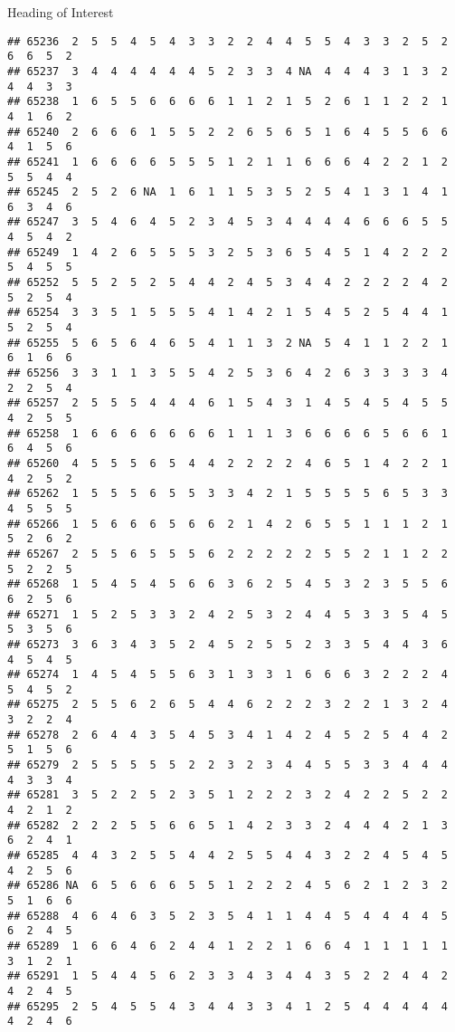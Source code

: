 \documentclass[
  ignorenonframetext,
]{beamer}
\begin{document}
\begin{frame}[fragile]{Heading of Interest}
\begin{verbatim}
## 65236  2  5  5  4  5  4  3  3  2  2  4  4  5  5  4  3  3  2  5  2  6  6  5  2
## 65237  3  4  4  4  4  4  4  5  2  3  3  4 NA  4  4  4  3  1  3  2  4  4  3  3
## 65238  1  6  5  5  6  6  6  6  1  1  2  1  5  2  6  1  1  2  2  1  4  1  6  2
## 65240  2  6  6  6  1  5  5  2  2  6  5  6  5  1  6  4  5  5  6  6  4  1  5  6
## 65241  1  6  6  6  6  5  5  5  1  2  1  1  6  6  6  4  2  2  1  2  5  5  4  4
## 65245  2  5  2  6 NA  1  6  1  1  5  3  5  2  5  4  1  3  1  4  1  6  3  4  6
## 65247  3  5  4  6  4  5  2  3  4  5  3  4  4  4  4  6  6  6  5  5  4  5  4  2
## 65249  1  4  2  6  5  5  5  3  2  5  3  6  5  4  5  1  4  2  2  2  5  4  5  5
## 65252  5  5  2  5  2  5  4  4  2  4  5  3  4  4  2  2  2  2  4  2  5  2  5  4
## 65254  3  3  5  1  5  5  5  4  1  4  2  1  5  4  5  2  5  4  4  1  5  2  5  4
## 65255  5  6  5  6  4  6  5  4  1  1  3  2 NA  5  4  1  1  2  2  1  6  1  6  6
## 65256  3  3  1  1  3  5  5  4  2  5  3  6  4  2  6  3  3  3  3  4  2  2  5  4
## 65257  2  5  5  5  4  4  4  6  1  5  4  3  1  4  5  4  5  4  5  5  4  2  5  5
## 65258  1  6  6  6  6  6  6  6  1  1  1  3  6  6  6  6  5  6  6  1  6  4  5  6
## 65260  4  5  5  5  6  5  4  4  2  2  2  2  4  6  5  1  4  2  2  1  4  2  5  2
## 65262  1  5  5  5  6  5  5  3  3  4  2  1  5  5  5  5  6  5  3  3  4  5  5  5
## 65266  1  5  6  6  6  5  6  6  2  1  4  2  6  5  5  1  1  1  2  1  5  2  6  2
## 65267  2  5  5  6  5  5  5  6  2  2  2  2  2  5  5  2  1  1  2  2  5  2  2  5
## 65268  1  5  4  5  4  5  6  6  3  6  2  5  4  5  3  2  3  5  5  6  6  2  5  6
## 65271  1  5  2  5  3  3  2  4  2  5  3  2  4  4  5  3  3  5  4  5  5  3  5  6
## 65273  3  6  3  4  3  5  2  4  5  2  5  5  2  3  3  5  4  4  3  6  4  5  4  5
## 65274  1  4  5  4  5  5  6  3  1  3  3  1  6  6  6  3  2  2  2  4  5  4  5  2
## 65275  2  5  5  6  2  6  5  4  4  6  2  2  2  3  2  2  1  3  2  4  3  2  2  4
## 65278  2  6  4  4  3  5  4  5  3  4  1  4  2  4  5  2  5  4  4  2  5  1  5  6
## 65279  2  5  5  5  5  5  2  2  3  2  3  4  4  5  5  3  3  4  4  4  4  3  3  4
## 65281  3  5  2  2  5  2  3  5  1  2  2  2  3  2  4  2  2  5  2  2  4  2  1  2
## 65282  2  2  2  5  5  6  6  5  1  4  2  3  3  2  4  4  4  2  1  3  6  2  4  1
## 65285  4  4  3  2  5  5  4  4  2  5  5  4  4  3  2  2  4  5  4  5  4  2  5  6
## 65286 NA  6  5  6  6  6  5  5  1  2  2  2  4  5  6  2  1  2  3  2  5  1  6  6
## 65288  4  6  4  6  3  5  2  3  5  4  1  1  4  4  5  4  4  4  4  5  6  2  4  5
## 65289  1  6  6  4  6  2  4  4  1  2  2  1  6  6  4  1  1  1  1  1  3  1  2  1
## 65291  1  5  4  4  5  6  2  3  3  4  3  4  4  3  5  2  2  4  4  2  4  2  4  5
## 65295  2  5  4  5  5  4  3  4  4  3  3  4  1  2  5  4  4  4  4  4  4  2  4  6

\end{verbatim}
\end{frame}
\end{document}

